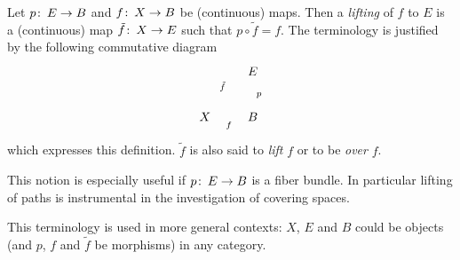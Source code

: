 \documentclass[12pt]{article}
\theoremstyle{definition}
\theoremstyle{remark}
\numberwithin{equation}{subsection}
\def\co{\colon\thinspace}
\begin{document}
Let $p\co E\to B$  and $f\co X\to B$  be  (continuous) maps. Then a
\emph{lifting} of $f$ to $E$ is a (continuous) map $\tilde f\co X\to E$ such that $p\circ \tilde
f=f$. The terminology is justified by the following commutative diagram
$$\xymatrix{
&{E}\ar[d]^{p}\\
{X}\ar@{-->}[ur]^{\tilde f}\ar[r]_{f} & {B} }
$$
which expresses this definition.   $\tilde f$ is also said to \emph{lift}
$f$ or to be \emph{over} $f$.

This notion is especially useful if $p\co E\to B$ is a fiber bundle. In
particular lifting of paths is instrumental in the investigation of covering
spaces. 

This terminology is used in more general contexts: $X$, $E$ and $B$ could be
objects (and $p$, $f$ and $\tilde f$ be morphisms) in any category.
\end{document}
